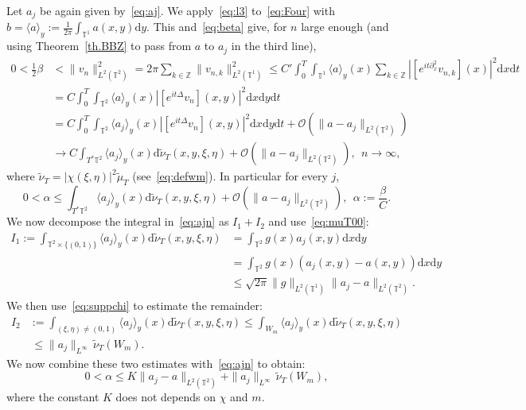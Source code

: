 \documentclass[10pt]{amsart}
\theoremstyle{definition}\newtheorem{defi}[theo]{Definition}\newtheorem{rema}[theo]{Remark}\newtheorem{exam}[theo]{Example}\newtheorem{exem}[theo]{Example}\newtheorem{nota}[theo]{Notation}
\newcommand{\TT}{{\mathbb T}}
\newcommand{\ZZ}{{\mathbb Z}}
\newcommand*{\dd}{\mathrm{d}}
\newcommand*{\dx}{\dd x}
\newcommand*{\dy}{\dd y}
\newcommand*{\dt}{\dd t}
\newcommand*{\dwnu}{\dd \widetilde\nu}
\begin{document}
Let $ a_j $ be again given by~\eqref{eq:aj}. We apply~\eqref{eq:l3} to~\eqref{eq:Four} with $ b = \langle a \rangle_y := \frac{1}{ 2 \pi} \int_{ \TT^1} a (x, y) \dy $. This and~\eqref{eq:beta} give, for $ n $ large enough (and using Theorem~\ref{th.BBZ} to pass from $ a$ to $ a_j $ in the third line),
\begin{align*}
0 < \tfrac12 \beta & < \| v_n \|_{L^2 (\TT^2) }^2 = 2 \pi \sum_{k \in \ZZ } \| v_{n,k} \|_{ L^2 (\TT^1) }^2
\leq C' \int_0^T \int_{\TT^1} \langle a \rangle_y (x) \sum_{ k \in \ZZ} | [e^{ it \partial_x^2 } v_{n,k}] (x) |^2 \dx \dt
\\
& = C \int_0^T \int_{ \TT^2 } \langle a \rangle_y (x) |[e^{ it \Delta } v_n] (x, y) |^2 \dx \dy \dt \\
& = C \int_0^T \int_{\TT^2} \langle a_j \rangle_y (x) | [e^{ it \Delta } v_n] (x, y) |^2 \dx \dy \dt +
\mathcal O (\| a - a_j \|_{L^2 (
\TT^2) }) \\
& \longrightarrow C \int_{T^* \TT^2 }
\langle a_j \rangle_y (x) \dwnu_T (x, y, \xi, \eta) + \mathcal O (\| a - a_j \|_{L^2 (
\TT^2) }), \ \ n \longrightarrow \infty,
\end{align*}
where $ \widetilde \nu_T = |\chi (\xi, \eta)|^2 \widetilde \mu_T $ (see~\eqref{eq:defwm}). In particular for every $ j $,
\begin{equation}\label{eq:ajn}
0 < \alpha \leq \int_{T^* \TT^2 }
\langle a_j \rangle_y (x) \dwnu_T (x, y, \xi, \eta) + \mathcal O (\| a - a_j \|_{L^2 (
\TT^2) }), \ \
\alpha := \frac{ \beta}{ C }.
\end{equation}
We now decompose the integral in~\eqref{eq:ajn} as $ I_1 + I_2 $ and use~\eqref{eq:muT00}:
\begin{equation}\label{eq:aj1}
\begin{split}
I_1 := \int_{ \TT^2 \times \{ (0, 1) \} } \langle a_j \rangle_y (x) \dwnu_T (x, y, \xi, \eta) & =
\int_{ \TT^2 } g (x) a_j (x, y) \dx \dy \\
& =
\int_{ \TT^2 } g (x) (a_j (x, y) - a (x, y)) \dx \dy \\
& \leq {\sqrt{ 2 \pi }} \| g \|_{ L^2 (\TT^1) } \| a_j - a \|_{L^2 (\TT^2) }.
\end{split}
\end{equation}
We then use~\eqref{eq:suppchi} to estimate the remainder:
\[
\begin{split}
I_2 & := \int_{ (\xi, \eta) \neq (0, 1) }
\langle a_j \rangle_y (x) \dwnu_T (x, y, \xi, \eta)
\leq \int_{W_m } \langle a_j \rangle_y (x) \dwnu_T (x, y, \xi, \eta) \\
&\, \leq \| a_j \|_{ L^\infty } \, \widetilde \nu_T (W_m).
\end{split}
\]
We now combine these two estimates with~\eqref{eq:ajn} to obtain:
\[
0 < \alpha \leq K \| a_j - a \|_{L^2 (\TT^2) } + \| a_j \|_{ L^\infty } \, \widetilde \nu_T (W_m),
\]
where the constant $ K $ does not depends on $ \chi $ and $ m $.
\end{document}
